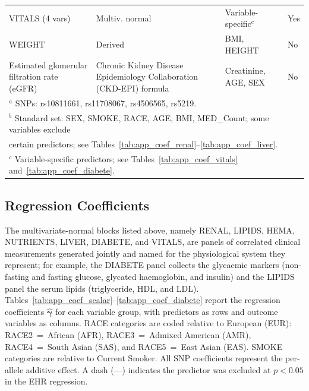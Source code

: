 \begin{table}[ht]
\begin{tabular}{p{3.2cm}p{3.2cm}p{4.9cm}p{1.5cm}}
VITALS (4 vars) & Multiv. normal & Variable-specific$^c$ & Yes \\
WEIGHT & Derived & BMI, HEIGHT & No \\
Estimated glomerular filtration rate (eGFR) & Chronic Kidney Disease Epidemiology Collaboration (CKD-EPI) formula & Creatinine, AGE, SEX & No \\
\hline
\multicolumn{4}{l}{$^a$ SNPs: rs10811661, rs11708067, rs4506565, rs5219.} \\
\multicolumn{4}{l}{$^b$ Standard set: SEX, SMOKE, RACE, AGE, BMI, MED\_Count; some variables exclude} \\
\multicolumn{4}{l}{\phantom{$^b$} certain predictors; see Tables~\ref{tab:app_coef_renal}--\ref{tab:app_coef_liver}.} \\
\multicolumn{4}{l}{$^c$ Variable-specific predictors; see Tables~\ref{tab:app_coef_vitals} and~\ref{tab:app_coef_diabete}.} \\
\end{tabular}
\end{table}

\subsection{Regression Coefficients}
\label{app:sim2_coef}

The multivariate-normal blocks listed above, namely RENAL, LIPIDS, HEMA, NUTRIENTS, LIVER, DIABETE, and VITALS, are panels of correlated clinical measurements generated jointly and named for the physiological system they represent; for example, the DIABETE panel collects the glycaemic markers (non-fasting and fasting glucose, glycated haemoglobin, and insulin) and the LIPIDS panel the serum lipids (triglyceride, HDL, and LDL). Tables~\ref{tab:app_coef_scalar}--\ref{tab:app_coef_diabete} report the regression coefficients $\hat{\boldsymbol{\gamma}}$ for each variable group, with predictors as rows and outcome variables as columns. RACE categories are coded relative to European (EUR): RACE2~=~African (AFR), RACE3~=~Admixed American (AMR), RACE4~=~South Asian (SAS), and RACE5~=~East Asian (EAS). SMOKE categories are relative to Current Smoker. All SNP coefficients represent the per-allele additive effect. A dash (---) indicates the predictor was excluded at $p < 0.05$ in the EHR regression.


